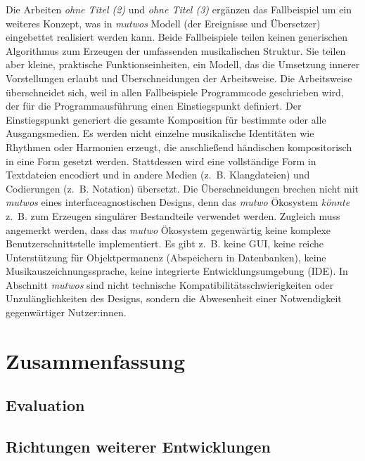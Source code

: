 \documentclass[12pt,a4paper,ngerman]{article}
\begin{document}
Die Arbeiten \emph{ohne Titel (2)} und  \emph{ohne Titel (3)} ergänzen das Fallbeispiel  um ein weiteres Konzept, was in \emph{mutwos} Modell (der Ereignisse und Übersetzer) eingebettet realisiert werden kann.
Beide Fallbeispiele teilen keinen generischen Algorithmus zum Erzeugen der umfassenden musikalischen Struktur.
Sie teilen aber kleine, praktische Funktionseinheiten, ein Modell, das die Umsetzung innerer Vorstellungen erlaubt und Überschneidungen der Arbeitsweise.
Die Arbeitsweise überschneidet sich, weil in allen Fallbeispiele Programmcode geschrieben wird, der für die Programmausführung einen Einstiegspunkt definiert.
Der Einstiegspunkt generiert die gesamte Komposition für bestimmte oder alle Ausgangsmedien.
Es werden nicht einzelne musikalische Identitäten wie Rhythmen oder Harmonien erzeugt, die anschließend händischen kompositorisch in eine Form gesetzt werden.
Stattdessen wird eine vollständige Form in Textdateien encodiert und in andere Medien (z.~B. Klangdateien) und Codierungen (z.~B. Notation) übersetzt.
Die Überschneidungen brechen nicht mit \emph{mutwos} \emph{} eines interfaceagnostischen Designs, denn das \emph{mutwo} Ökosystem \emph{könnte} z.~B. zum Erzeugen singulärer Bestandteile verwendet werden.
Zugleich muss angemerkt werden, dass das \emph{mutwo} Ökosystem gegenwärtig keine komplexe Benutzerschnittstelle implementiert. 
Es gibt z.~B. keine GUI, keine reiche Unterstützung für Objektpermanenz (Abspeichern in Datenbanken), keine Musikauszeichnungssprache, keine integrierte Entwicklungsumgebung (IDE).
In Abschnitt \emph{} \emph{mutwos} sind nicht technische Kompatibilitätsschwierigkeiten oder Unzulänglichkeiten des Designs, sondern die Abwesenheit einer Notwendigkeit gegenwärtiger Nutzer:innen.

\bigskip


%



\section{Zusammenfassung}

\subsection{Evaluation}


\subsection{Richtungen weiterer Entwicklungen}


\newpage

\printbibliography

\newpage

\appendix


\newpage

\listoffigures
\end{document}
